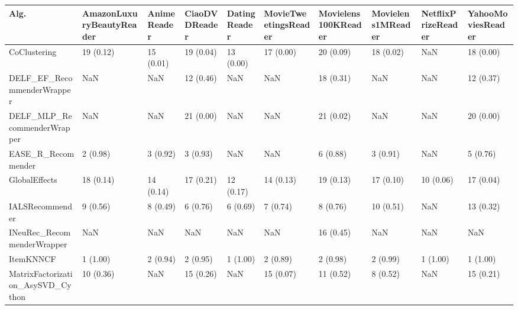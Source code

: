 \begin{tabular}{llllllllll}
\toprule
                               Alg. & AmazonLuxuryBeautyReader & AnimeReader & CiaoDVDReader & DatingReader & MovieTweetingsReader & Movielens100KReader & Movielens1MReader & NetflixPrizeReader & YahooMoviesReader \\
\midrule
                       CoClustering &                19 (0.12) &   15 (0.01) &     19 (0.04) &    13 (0.00) &            17 (0.00) &           20 (0.09) &         18 (0.02) &                NaN &         18 (0.00) \\
         DELF\_EF\_RecommenderWrapper &                      NaN &         NaN &     12 (0.46) &          NaN &                  NaN &           18 (0.31) &               NaN &                NaN &         12 (0.37) \\
        DELF\_MLP\_RecommenderWrapper &                      NaN &         NaN &     21 (0.00) &          NaN &                  NaN &           21 (0.02) &               NaN &                NaN &         20 (0.00) \\
                 EASE\_R\_Recommender &                 2 (0.98) &    3 (0.92) &      3 (0.93) &          NaN &                  NaN &            6 (0.88) &          3 (0.91) &                NaN &          5 (0.76) \\
                      GlobalEffects &                18 (0.14) &   14 (0.14) &     17 (0.21) &    12 (0.17) &            14 (0.13) &           19 (0.13) &         17 (0.10) &          10 (0.06) &         17 (0.04) \\
                    IALSRecommender &                 9 (0.56) &    8 (0.49) &      6 (0.76) &     6 (0.69) &             7 (0.74) &            8 (0.76) &         10 (0.51) &                NaN &         13 (0.32) \\
         INeuRec\_RecommenderWrapper &                      NaN &         NaN &           NaN &          NaN &                  NaN &           16 (0.45) &               NaN &                NaN &               NaN \\
                          ItemKNNCF &                 1 (1.00) &    2 (0.94) &      2 (0.95) &     1 (1.00) &             2 (0.89) &            2 (0.98) &          2 (0.99) &           1 (1.00) &          1 (1.00) \\
  MatrixFactorization\_AsySVD\_Cython &                10 (0.36) &         NaN &     15 (0.26) &          NaN &            15 (0.07) &           11 (0.52) &          8 (0.52) &                NaN &         15 (0.21) \\

\end{tabular}
